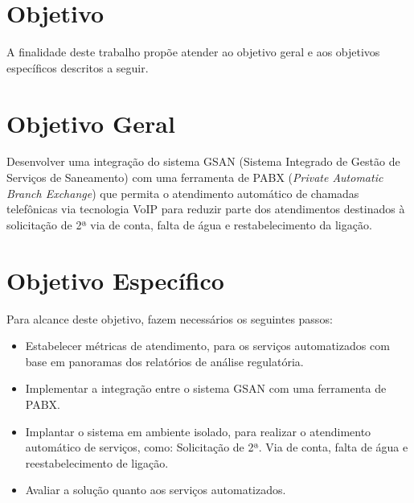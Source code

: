 \section{Objetivo}

A finalidade deste trabalho propõe atender ao objetivo geral e aos objetivos específicos descritos a seguir.

\section{Objetivo Geral}

Desenvolver uma integração do sistema GSAN (Sistema Integrado de Gestão de Serviços de Saneamento) com uma ferramenta de PABX (\textit{Private Automatic Branch Exchange}) que permita o atendimento automático de chamadas telefônicas via tecnologia VoIP para reduzir parte dos atendimentos destinados à solicitação de 2ª via de conta, falta de água e restabelecimento da ligação.

\section{Objetivo Específico}
Para alcance deste objetivo, fazem necessários os seguintes passos:
\begin{itemize}
	\item Estabelecer métricas de atendimento, para os serviços automatizados com base em panoramas dos relatórios de análise regulatória. 
	\item Implementar a integração entre o sistema GSAN com uma ferramenta de PABX.
	\item Implantar o sistema em ambiente isolado, para realizar o atendimento automático de serviços, como: Solicitação de 2ª. Via de conta, falta de água e reestabelecimento de ligação.
	\item Avaliar a solução quanto aos serviços automatizados.
\end{itemize}